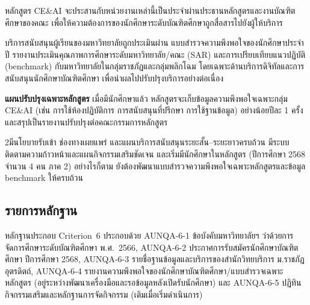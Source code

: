 หลักสูตร CE\&AI จะประสานกับหน่วยงานเหล่านี้เป็นประจำผ่านประธานหลักสูตรและงานบัณฑิตศึกษาของคณะ เพื่อให้ความต้องการของนักศึกษาระดับบัณฑิตศึกษาถูกสื่อสารไปยังผู้ให้บริการ


บริการสนับสนุนผู้เรียนของมหาวิทยาลัยถูกประเมินผ่าน
แบบสำรวจความพึงพอใจของนักศึกษาประจำปี รายงานประเมินคุณภาพการศึกษาระดับมหาวิทยาลัย/คณะ (SAR) และการเปรียบเทียบแนวปฏิบัติ (benchmark) กับมหาวิทยาลัยในกลุ่มราชภัฏและกลุ่มพลิกโฉม โดยเฉพาะด้านบริการดิจิทัลและการสนับสนุนนักศึกษาบัณฑิตศึกษา เพื่อนำผลไปปรับปรุงบริการอย่างต่อเนื่อง

\textbf{แผนปรับปรุงเฉพาะหลักสูตร} เมื่อมีนักศึกษาแล้ว หลักสูตรจะเก็บข้อมูลความพึงพอใจเฉพาะกลุ่ม CE\&AI (เช่น การใช้ห้องปฏิบัติการ การสนับสนุนที่ปรึกษา การใช้ฐานข้อมูล) อย่างน้อยปีละ 1 ครั้ง และสรุปเป็นรายงานปรับปรุงต่อคณะกรรมการหลักสูตร


\begin{selfassessmentbox}{2}{มีนโยบายรับเข้า ช่องทางเผยแพร่ และแผนบริการสนับสนุนระยะสั้น--ระยะยาวครบถ้วน มีระบบติดตามความก้าวหน้าและแผนกิจกรรมเสริมชัดเจน และเริ่มมีนักศึกษาในหลักสูตร (ปีการศึกษา 2568 จำนวน 4 คน ภาค 2) อย่างไรก็ตาม ยังต้องพัฒนาแบบสำรวจความพึงพอใจเฉพาะหลักสูตรและข้อมูล benchmark ให้ครบถ้วน}
\end{selfassessmentbox}

\subsection*{รายการหลักฐาน}

หลักฐานประกอบ Criterion~6 ประกอบด้วย AUNQA-6-1 ข้อบังคับมหาวิทยาลัยฯ ว่าด้วยการจัดการศึกษาระดับบัณฑิตศึกษา พ.ศ.~2566, AUNQA-6-2 ประกาศการรับสมัครนักศึกษาบัณฑิตศึกษา ปีการศึกษา 2568, AUNQA-6-3 รายชื่อฐานข้อมูลและบริการของสำนักวิทยบริการ ม.ราชภัฏอุตรดิตถ์, AUNQA-6-4 รายงานความพึงพอใจของนักศึกษาบัณฑิตศึกษา/แบบสำรวจเฉพาะหลักสูตร (อยู่ระหว่างพัฒนาเครื่องมือและรอข้อมูลหลังเปิดรับนักศึกษา) และ AUNQA-6-5 ปฏิทินกิจกรรมเสริมและหลักฐานการจัดกิจกรรม (เติมเมื่อเริ่มดำเนินการ)
